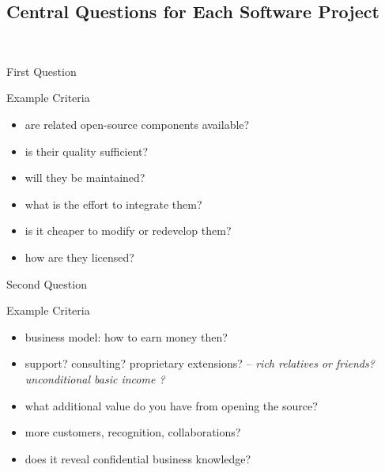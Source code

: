 \subsection{Central Questions for Each Software Project}
\begin{frame}{\insertsubsection\ \mytitlesource{\sommerville}}
	\begin{fancycolumns}
		\begin{note}{First Question}
		\end{note}
		\begin{example}{Example Criteria}
			\begin{itemize}
				\item are related open-source components available?
				\item is their quality sufficient?
				\item will they be maintained?
				\item what is the effort to integrate them?
				\item is it cheaper to modify or redevelop them?
				\item how are they licensed?
			\end{itemize}
		\end{example}
		\nextcolumn
		\begin{note}{Second Question}
		\end{note}
		\begin{example}{Example Criteria}
			\begin{itemize}
				\item business model: how to earn money then? %
				\item support? consulting? proprietary extensions? -- \textit{rich relatives or friends? unconditional basic income ?}
				\item what additional value do you have from opening the source?
				\item more customers, recognition, collaborations?
				\item does it reveal confidential business knowledge?
			\end{itemize}
		\end{example}
	\end{fancycolumns}
\end{frame}

